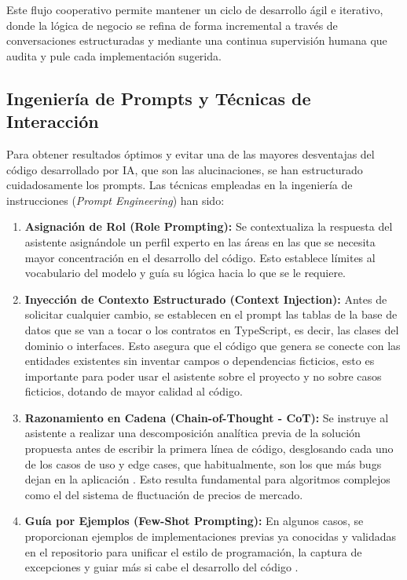 Este flujo cooperativo permite mantener un ciclo de desarrollo ágil e iterativo, donde la lógica de negocio se refina de forma incremental a través de conversaciones estructuradas y mediante una continua supervisión humana que audita y pule cada implementación sugerida.

\subsection{Ingeniería de Prompts y Técnicas de Interacción}
Para obtener resultados óptimos y evitar una de las mayores desventajas del código desarrollado por IA, que son las alucinaciones, se han estructurado cuidadosamente los prompts. Las técnicas empleadas en la ingeniería de instrucciones (\textit{Prompt Engineering}) han sido:

\begin{enumerate}
    \item \textbf{Asignación de Rol (Role Prompting):} Se contextualiza la respuesta del asistente asignándole un perfil experto en las áreas en las que se necesita mayor concentración en el desarrollo del código. Esto establece límites al vocabulario del modelo y guía su lógica hacia lo que se le requiere.
    \item \textbf{Inyección de Contexto Estructurado (Context Injection):} Antes de solicitar cualquier cambio, se establecen en el prompt las tablas de la base de datos que se van a tocar o los contratos en TypeScript, es decir, las clases del dominio o interfaces. Esto asegura que el código que genera se conecte con las entidades existentes sin inventar campos o dependencias ficticios, esto es importante para poder usar el asistente sobre el proyecto y no sobre casos ficticios, dotando de mayor calidad al código.
    \item \textbf{Razonamiento en Cadena (Chain-of-Thought - CoT):} Se instruye al asistente a realizar una descomposición analítica previa de la solución propuesta antes de escribir la primera línea de código, desglosando cada uno de los casos de uso y edge cases, que habitualmente, son los que más bugs dejan en la aplicación \cite{wei_cot}. Esto resulta fundamental para algoritmos complejos como el del sistema de fluctuación de precios de mercado.
    \item \textbf{Guía por Ejemplos (Few-Shot Prompting):} En algunos casos, se proporcionan ejemplos de implementaciones previas ya conocidas y validadas en el repositorio para unificar el estilo de programación, la captura de excepciones y guiar más si cabe el desarrollo del código \cite{brown_fewshot}.
\end{enumerate}

